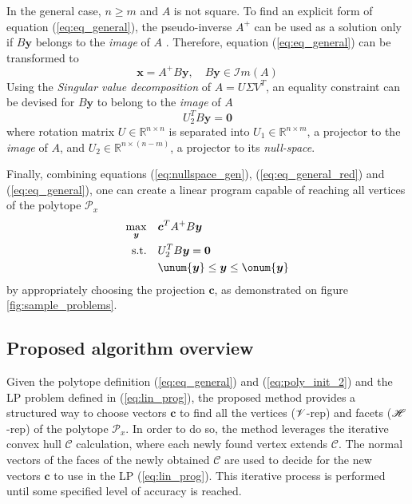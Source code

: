 In the general case, $n\geq m$ and $A$ is not square. To find an explicit form of equation (\ref{eq:eq_general}), the pseudo-inverse $A^+$ can be used as a solution only if $B\bm{y}$ belongs to the \textit{image} of $A$ \cite{klema_singular_1980}. Therefore, equation (\ref{eq:eq_general}) can be transformed to 
\begin{equation}
    \bm{x} = A^{+} B \bm{y}, \quad B\bm{y} \in \mathcal{I}m(A)
    \label{eq:eq_general_red}
\end{equation} 
Using the \textit{Singular value decomposition} \cite{klema_singular_1980} of  $A = U\Sigma V^T$, an equality constraint can be devised for $B\bm{y}$ to belong to the \textit{image} of $A$
\begin{equation}
    U_2^TB\bm{y} = \bm{0}
    \label{eq:nullspace_gen}
\end{equation}
where rotation matrix $U \in \mathbb{R}^{n\times n }$ is separated into  $U_1\in \mathbb{R}^{n\times m}$, a projector to the  \textit{image} of $A$, and $U_2\in \mathbb{R}^{n\times(n-m)}$, a projector to its \textit{null-space}.

Finally, combining equations (\ref{eq:nullspace_gen}), (\ref{eq:eq_general_red}) and (\ref{eq:eq_general}), one can create a linear program \cite{vajda_gass_1964} capable of reaching all  vertices of the polytope $\mathcal{P}_x$
\begin{equation}
\begin{aligned}
    \max_{\bm{y}} \quad &  \bm{c}^TA^{+}B\bm{y} \\
     \textrm{s.t.} \quad &  U_2^TB\bm{y} = \bm{0} \\
          & \unum{\bm{y}} \leq \bm{y} \leq \onum{\bm{y}} \\
\end{aligned}
\label{eq:lin_prog}
\end{equation}
by appropriately choosing the projection $\bm{c}$, as demonstrated on figure \ref{fig:sample_problems}.


\subsection{Proposed algorithm overview}
\label{ch:method}

Given the polytope definition (\ref{eq:eq_general}) and (\ref{eq:poly_init_2}) and the LP problem defined in (\ref{eq:lin_prog}), the proposed method provides a structured way to choose vectors $\bm{c}$ to find all the vertices ($\mathscr{V}$-rep) and facets ($\mathscr{H}$-rep) of the polytope $\mathcal{P}_x$. 
In order to do so, the method leverages the iterative convex hull $\mathcal{C}$ calculation, where each newly found vertex extends $\mathcal{C}$. The normal vectors of the faces of the newly obtained $\mathcal{C}$ are used to decide for the new vectors $\bm{c}$ to use in the LP (\ref{eq:lin_prog}). This iterative process is performed until some specified level of accuracy is reached.

